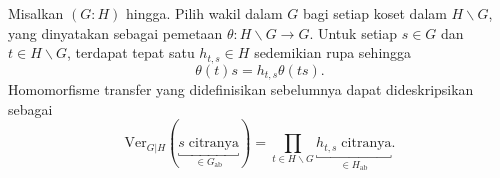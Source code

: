 \begin{proposisi}
	Misalkan $(G:H)$ hingga. Pilih wakil dalam $G$ bagi setiap koset dalam
	$H\backslash G$, yang dinyatakan sebagai pemetaan
	$\theta:H\backslash G\to G$. Untuk setiap $s\in G$ dan
	$t\in H\backslash G$, terdapat tepat satu $h_{t,s}\in H$ sedemikian
	rupa sehingga
	\[ \theta(t)s = h_{t, s} \theta(ts). \]
	Homomorfisme transfer yang didefinisikan sebelumnya dapat dideskripsikan
	sebagai
	\[ \mathrm{Ver}_{G|H}(\underbracket{s\;\text{citranya}}_{\in G_{\mathrm{ab}}}) = \prod_{t \in H \backslash G} \underbracket{h_{t, s}\;\text{citranya}}_{\in H_{\mathrm{ab}}}. \]
\end{proposisi}
